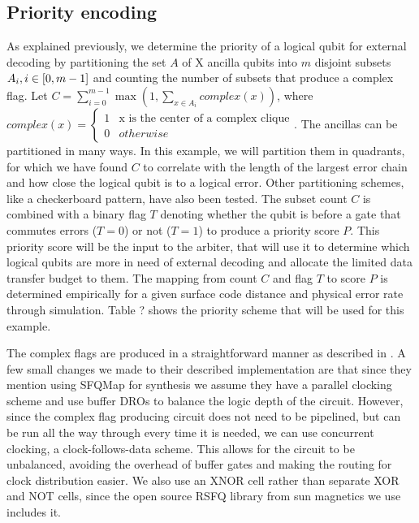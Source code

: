 \documentclass[conference]{IEEEtran}
\begin{document}
\subsection{Priority encoding}
As explained previously, we determine the priority of a logical qubit for external decoding by partitioning the set $A$ of X ancilla qubits into $m$ disjoint subsets $A_i, i \in \interval{0}{m-1}$ and counting the number of subsets that produce a complex flag.
Let $C = \sum_{i=0}^{m-1} \max(1, \sum_{x \in A_i}{complex(x)})$, where 
$complex(x) = \begin{cases} 1 &
\text{x is the center of a complex clique} \\ 0 & otherwise \end{cases}$.
The ancillas can be partitioned in many ways.
In this example, we will partition them in quadrants, for which we have found $C$ to correlate with the length of the largest error chain and how close the logical qubit is to a logical error.
Other partitioning schemes, like a checkerboard pattern, have also been tested.
The subset count $C$ is combined with a binary flag $T$ denoting whether the qubit is before a gate that commutes errors ($T=0$) or not ($T=1$) to produce a priority score $P$.
This priority score will be the input to the arbiter, that will use it to determine which logical qubits are more in need of external decoding and allocate the limited data transfer budget to them.
The mapping from count $C$ and flag $T$ to score $P$ is determined empirically for a given surface code distance and physical error rate through simulation.
Table ? shows the priority scheme that will be used for this example.

The complex flags are produced in a straightforward manner as described in \cite{clique}.
A few small changes we made to their described implementation are that since they mention using SFQMap \cite{sfqmap} for synthesis we assume they have a parallel clocking scheme and use buffer DROs to balance the logic depth of the circuit. 
However, since the complex flag producing circuit does not need to be pipelined, but can be run all the way through every time it is needed, we can use concurrent clocking, a clock-follows-data scheme.
This allows for the circuit to be unbalanced, avoiding the overhead of buffer gates and making the routing for clock distribution easier.
We also use an XNOR cell rather than separate XOR and NOT cells, since the open source RSFQ library from sun magnetics we use \cite{rsfqlib} includes it.
\end{document}
